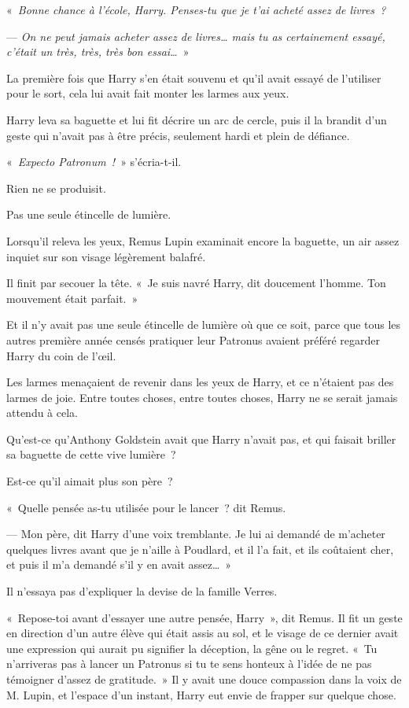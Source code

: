 «~\emph{Bonne chance à l'école, Harry. Penses-tu que je t'ai acheté assez de livres~?}

--- \emph{On ne peut jamais acheter assez de livres… mais tu as certainement essayé, c'était un très, très, très bon essai…}~»

La première fois que Harry s'en était souvenu et qu'il avait essayé de l'utiliser pour le sort, cela lui avait fait monter les larmes aux yeux.

Harry leva sa baguette et lui fit décrire un arc de cercle, puis il la brandit d'un geste qui n'avait pas à être précis, seulement hardi et plein de défiance.

«~\emph{Expecto Patronum~!}~» s'écria-t-il.

Rien ne se produisit.

Pas une seule étincelle de lumière.

Lorsqu'il releva les yeux, Remus Lupin examinait encore la baguette, un air assez inquiet sur son visage légèrement balafré.

Il finit par secouer la tête. «~Je suis navré Harry, dit doucement l'homme. Ton mouvement était parfait.~»

Et il n'y avait pas une seule étincelle de lumière où que ce soit, parce que tous les autres première année censés pratiquer leur Patronus avaient préféré regarder Harry du coin de l'œil.

Les larmes menaçaient de revenir dans les yeux de Harry, et ce n'étaient pas des larmes de joie. Entre toutes choses, entre toutes choses, Harry ne se serait jamais attendu à cela.

Qu'est-ce qu'Anthony Goldstein avait que Harry n'avait pas, et qui faisait briller sa baguette de cette vive lumière~?

Est-ce qu'il aimait plus son père~?

«~Quelle pensée as-tu utilisée pour le lancer~? dit Remus.

--- Mon père, dit Harry d'une voix tremblante. Je lui ai demandé de m'acheter quelques livres avant que je n'aille à Poudlard, et il l'a fait, et ils coûtaient cher, et puis il m'a demandé s'il y en avait assez…~»

Il n'essaya pas d'expliquer la devise de la famille Verres.

«~Repose-toi avant d'essayer une autre pensée, Harry~», dit Remus. Il fit un geste en direction d'un autre élève qui était assis au sol, et le visage de ce dernier avait une expression qui aurait pu signifier la déception, la gêne ou le regret. «~Tu n'arriveras pas à lancer un Patronus si tu te sens honteux à l'idée de ne pas témoigner d'assez de gratitude.~» Il y avait une douce compassion dans la voix de M. Lupin, et l'espace d'un instant, Harry eut envie de frapper sur quelque chose.

